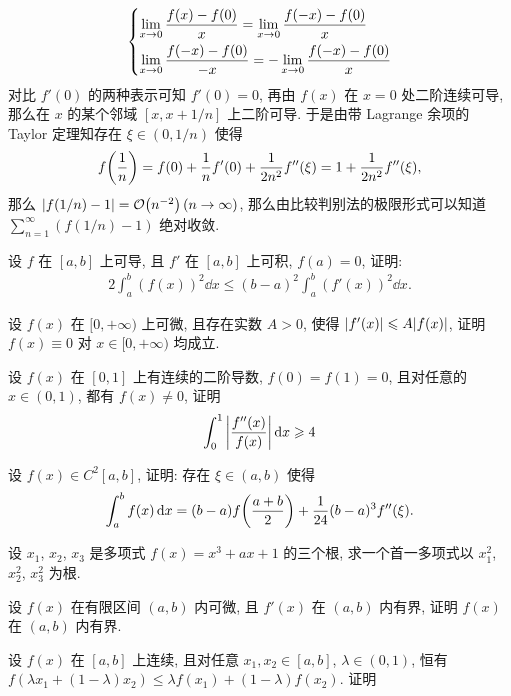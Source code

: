 \begin{exercise}[series=exer]
\begin{answer}
\begin{align*}
\begin{dcases}
                \lim_{x \to 0}\frac{f(x) - f(0)}{x} = \lim_{x \to 0}\frac{f(-x) - f(0)}{x} \\
                \lim_{x \to 0} \frac{f(-x) - f(0)}{-x} = -\lim_{x \to 0}\frac{f(-x) - f(0)}{x}
            \end{dcases}
        \end{align*}
        对比 $ f'(0) $ 的两种表示可知 $ f'(0) = 0 $, 再由 $ f(x) $ 在 $ x = 0 $ 处二阶连续可导, 那么在 $ x $ 的某个邻域 $ [x, x+1/n] $ 上二阶可导. 于是由带 Lagrange 余项的 Taylor 定理知存在 $ \xi \in (0, 1/n) $ 使得
        \begin{align*}
            f\qty(\frac{1}{n}) = f(0) + \frac{1}{n}f'(0) + \frac{1}{2n^{2}}f''(\xi) = 1 + \frac{1}{2n^{2}}f''(\xi), 
        \end{align*}
        那么 $ \abs{f(1/n) - 1} = \order{n^{-2}}\,(n \to \infty) $, 那么由比较判别法的极限形式可以知道 $ \sum_{n = 1}^{\infty} (f(1/n) - 1) $ 绝对收敛.
    \end{answer}
    \item 设 $ f $ 在 $ [a, b] $ 上可导, 且 $ f' $ 在 $ [a, b] $ 上可积, $ f(a) = 0 $, 证明:
    \begin{align*}
        2\int_{a}^{b}(f(x))^{2} \dd{x} \le (b-a)^{2} \int_{a}^{b} (f'(x))^{2} \dd{x}.
    \end{align*}
    \item 设 $ f(x) $ 在 $ [0, +\infty) $ 上可微, 且存在实数 $ A > 0 $, 使得 $ \abs{f'(x)} \leqslant A\abs{f(x)} $, 证明 $ f(x) \equiv 0 $ 对 $ x \in [0, +\infty) $ 均成立.
    \item 设 $ f(x) $ 在 $ [0, 1] $ 上有连续的二阶导数, $ f(0) = f(1) = 0 $, 且对任意的 $ x \in (0, 1) $, 都有 $ f(x) \ne 0 $, 证明
    \begin{align*}
        \int_{0}^{1} \abs{f''(x)\over f(x)} \dd{x} \geqslant 4
    \end{align*}
    \item 设 $ f(x) \in C^{2}[a, b] $, 证明: 存在 $ \xi \in (a, b) $ 使得
    \begin{align*}
        \int_{a}^{b} f(x) \dd{x} = (b - a) f\qty(\frac{a + b}{2}) + \frac{1}{24}(b - a)^{3} f''(\xi).
    \end{align*}
    \item 设 $ x_{1} $, $ x_{2} $, $ x_{3} $ 是多项式 $ f(x) = x^{3} + ax + 1 $ 的三个根, 求一个首一多项式以 $ x_{1}^{2} $, $ x_{2}^{2} $, $ x_{3}^{2} $ 为根.
    \item 设 $ f(x) $ 在有限区间 $ (a, b) $ 内可微, 且 $ f'(x) $ 在 $ (a, b) $ 内有界, 证明 $ f(x) $ 在 $ (a, b) $ 内有界.
    \item 设 $ f(x) $ 在 $ [a, b] $ 上连续, 且对任意 $ x_{1}, x_{2} \in [a, b] $, $ \lambda \in (0, 1) $, 恒有 $ f(\lambda x_{1} + (1-\lambda) x_{2}) \le \lambda f(x_{1}) + (1 - \lambda) f(x_{2}) $. 证明

\end{exercise}
